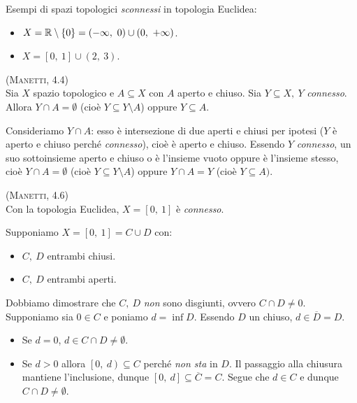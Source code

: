 \begin{examples} Esempi di spazi topologici \textit{sconnessi} in topologia Euclidea:
	\begin{itemize}
		\item $X=\realset\setminus\left\{0\right\}=\left(-\infty,\ 0\right)\cup \left(0,\ +\infty\right)$.
		\item $X=\left[0,\ 1\right]\cup \left(2,\ 3\right)$.
	\end{itemize}
\vspace{-3mm}
\end{examples}
\begin{lemming}\textsc{(Manetti, 4.4)}\\
Sia $X$ spazio topologico e $A\subseteq X$ con $A$ aperto e chiuso. Sia $Y\subseteq X,\ Y$ \textit{connesso}. Allora $Y\cap A=\emptyset$ (cioè $Y\subseteq Y\setminus A$) oppure $Y\subseteq A$.
\end{lemming}
\begin{demonstration}
Consideriamo $Y\cap A$: esso è intersezione di due aperti e chiusi per ipotesi ($Y$ è aperto e chiuso perché \textit{connesso}), cioè è aperto e chiuso. Essendo $Y$ \textit{connesso}, un suo sottoinsieme aperto e chiuso o è l'insieme vuoto oppure è l'insieme stesso, cioè $Y\cap A=\emptyset$ (cioè $Y\subseteq Y\setminus A$) oppure $Y\cap A=Y$ (cioè $Y\subseteq A)$.
\end{demonstration}
\begin{theorema}\textsc{(Manetti, 4.6)}\\
Con la topologia Euclidea, $X=\left[0,\ 1\right]$ è \textit{connesso}.
\end{theorema}
\begin{demonstration}
Supponiamo $X=\left[0,\ 1\right]=C\cup D$ con:
\begin{itemize}
	\item $C,\ D$ entrambi chiusi.
	\item $C,\ D$ entrambi aperti.
\end{itemize}
Dobbiamo dimostrare che $C,\ D$ \textit{non} sono disgiunti, ovvero $C\cap D\neq 0$. Supponiamo sia $0\in C$ e poniamo $d=\inf D$. Essendo $D$ un chiuso, $d\in \overline{D}=D$.
\begin{itemize}
	\item Se $d=0$, $d\in C\cap D\neq \emptyset$.
	\item Se $d>0$ allora $\left[0,\ d\right)\subseteq C$ perché \textit{non sta} in $D$. Il passaggio alla chiusura mantiene l'inclusione, dunque $\left[0,\ d\right]\subseteq \overline{C}=C$. Segue che $d\in C$ e dunque $C\cap D\neq \emptyset$.
\end{itemize}
\vspace{-3mm}
\end{demonstration}
